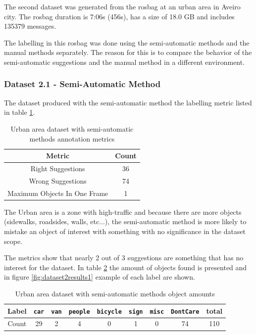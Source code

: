 The second dataset was generated from the rosbag at an urban area in Aveiro city. The rosbag duration is 7:06s (456s), has a size of 18.0 GB and includes 135379 messages. 

The labelling in this rosbag was done using the semi-automatic methods and the manual methods separately. The reason for this is to compare the behavior of the semi-automatic suggestions and the manual method in a different environment.

\subsubsection{Dataset 2.1 - Semi-Automatic Method}

The dataset produced with the semi-automatic method the labelling metric listed in table \ref{tab: urban1metrics}.

\begin{table}[htp]
	\centering
	\caption{Urban area dataset with semi-automatic methods annotation metrics}
	\label{tab: urban1metrics}
	\begin{tabular}{c|c}
		\textbf{Metric}              & \textbf{Count} \\ \hline
		Right Suggestions            & 36                      \\ \hline
		Wrong Suggestions            & 74                      \\ \hline
		Maximum Objects In One Frame & 1                      
	\end{tabular}
\end{table}

The Urban area is a zone with high-traffic and because there are more objects (sidewalks, roadsides, walls, etc...), the semi-automatic method is more likely to mistake an object of interest with something with no significance in the dataset scope. 

The metrics show that nearly 2 out of 3 suggestions are something that has no interest for the dataset. In table \ref{tab: urban1stats} the amount of objects found is presented and in figure \ref{fig:dataset2results1} example of each label are shown.

\begin{table}[htp]
	\centering
	\caption{Urban area dataset  with semi-automatic methods object amounts}
	\label{tab: urban1stats}
	\begin{tabular}{c|c|c|c|c|c|c|c|c}
		\textbf{Label} & \texttt{car} & \texttt{van} & \texttt{people} & \texttt{bicycle} & \texttt{sign} & \texttt{misc} & \texttt{DontCare} & \textbf{total} \\ \hline
		Count          & 29           & 2            & 4               & 0                & 1             & 0             & 74                & 110           
	\end{tabular}
\end{table}

